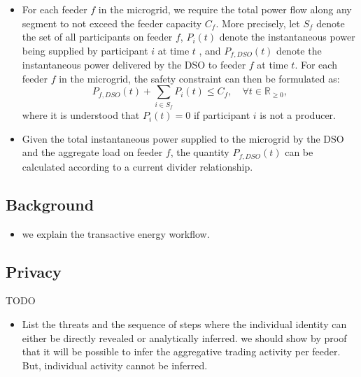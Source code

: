 \begin{itemize}
\item For each feeder $f$ in the microgrid, we require the total power flow along any segment to not exceed the feeder capacity $C_f$. More precisely, let $S_f$ denote the set of all participants on feeder $f$, $P_i(t)$ denote the instantaneous power being supplied by participant $i$ at time $t$
, and $P_{f,DSO}(t)$ denote the instantaneous power delivered by the DSO to feeder $f$ at time $t$. For each feeder $f$ in the microgrid, the safety constraint can then be formulated as:
\begin{equation}
P_{f,DSO}(t) + \sum_{i\in S_f} P_i(t) \leq C_f,\quad \forall t\in\mathbb{R}_{\geq 0},
\end{equation}
where it is understood that $P_i(t)=0$ if participant $i$ is not a producer.
\item Given the total instantaneous power supplied to the microgrid by the DSO and the aggregate load on feeder $f$, the quantity $P_{f,DSO}(t)$ can be calculated according to a current divider relationship. 
\end{itemize}

\subsection{Background}
\begin{itemize}
\item we explain the transactive energy workflow.
\end{itemize}
\subsection{Privacy}
TODO 
\begin{itemize}
\item List the threats and the sequence of steps where the individual identity can either be directly revealed or analytically inferred. we should show by proof that it will be possible to infer the aggregative trading activity per feeder. But, individual activity cannot be inferred.
\end{itemize}
